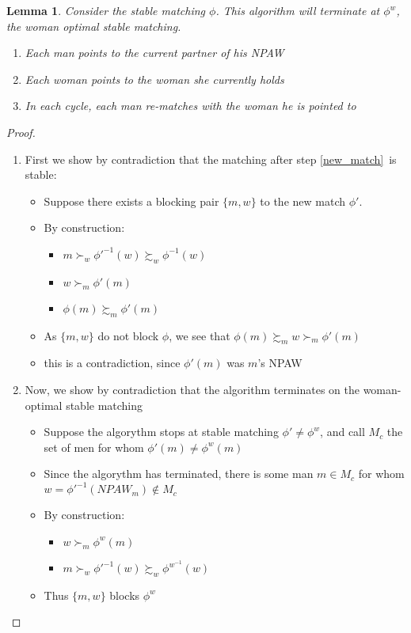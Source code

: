 \documentclass[WP]{AEA}
\newtheorem{lemma}{Lemma}
\begin{document}
\begin{lemma}
	Consider the stable matching $\phi$. This algorithm will terminate at  $\phi^w$, the woman optimal stable matching.
	\begin{enumerate}
		\item Each man points to the current partner of his NPAW
		\item Each woman points to the woman she currently holds
		\item \label{new_match} In each cycle, each man re-matches with the woman he is pointed to
	\end{enumerate}
\end{lemma}
\begin{proof}
	\begin{enumerate}
		\item 	First we show by contradiction that the matching after step \ref{new_match} is stable:
		\begin{itemize}
			\item Suppose there exists a blocking pair $\{m,w\}$ to the new match $\phi '$. 
			\item By construction:
					\begin{itemize}
						  \item $m \succ_w \phi '^{-1}(w) \succsim_w  \phi ^{-1}(w)$
						  \item  $w \succ_m \phi'(m)$
						  \item $\phi(m) \succsim_m \phi'(m)$
					\end{itemize}
			\item As $\{m,w\}$ do not block $\phi$, we see that $\phi(m) \succsim_m w \succ_m \phi'(m)$
			\item this is a contradiction, since $ \phi'(m)$ was $m$'s NPAW

		\end{itemize}	
		\item Now, we show by contradiction that the algorithm terminates on the woman-optimal stable matching
		\begin{itemize}
			\item Suppose the algorythm stops at stable matching $ \phi ' \neq \phi ^w$, and call $M_c$ the set of men for whom $ \phi '(m) \neq \phi ^w(m)$
			\item Since the algorythm has terminated, there is some man $m \in M_c$ for whom $w = \phi'^{-1} (NPAW_m) \notin  M_c$ 
			\item By construction:
			\begin{itemize}
					\item  $w \succ_m \phi^w(m)$
					\item  $m \succ_w \phi '^{-1}(w) \succsim_w  \phi^{w^{-1}}(w)$
			\end{itemize}
			\item Thus $\{m,w\}$ blocks $\phi^w$ 
		\end{itemize}
	\end{enumerate}
\end{proof}
\end{document}
